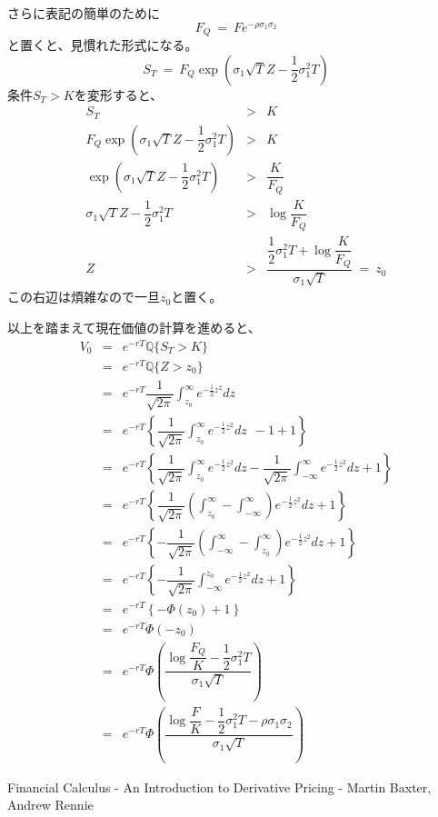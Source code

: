 \documentclass[uplatex,a4j,12pt,dvipdfmx]{jsarticle}
\begin{document}
さらに表記の簡単のために
$$
	F_{Q} \ = \ F e^{- \rho \sigma_{1} \sigma_{2} }
$$
と置くと、見慣れた形式になる。
$$
	S_{T}
	\ = \
	F_{Q}
	\exp \left( \sigma_{1} \sqrt{T} Z -
	\dfrac{1}{2} \sigma_{1}^{2} T
	\right)
$$
条件$S_{T}>K$を変形すると、
%
%
\begin{eqnarray*}
	S_{T}
	&>&
	K
	\\
	F_{Q}
	\exp \left( \sigma_{1} \sqrt{T} Z -
	\dfrac{1}{2} \sigma_{1}^{2} T
	\right)
	&>&
	K
	\\
	\exp \left( \sigma_{1} \sqrt{T} Z -
	\dfrac{1}{2} \sigma_{1}^{2} T
	\right)
	&>&
	\dfrac{K}{F_{Q}}
	\\
	\sigma_{1} \sqrt{T} Z -
	\dfrac{1}{2} \sigma_{1}^{2} T
	&>&
	\log
	\dfrac{K}{F_{Q}}
	\\
	Z
	&>&
	\dfrac{
		\dfrac{1}{2} \sigma_{1}^{2} T +
		\log
		\dfrac{K}{F_{Q}}
	}{\sigma_{1} \sqrt{T}}
	\ = \
	z_{0}
\end{eqnarray*}
%
%
この右辺は煩雑なので一旦$z_{0}$と置く。

以上を踏まえて現在価値の計算を進めると、
%
%
\begin{eqnarray*}
	V_{0}
	&=&
	e^{-rT}
	\mathbb{Q}
	\{ S_{T} > K \}
	\\ &=&
	e^{-rT}
	\mathbb{Q}
	\{ Z > z_{0} \}
	\\ &=&
	e^{-rT}
	\dfrac{1}{ \sqrt{2 \pi} }
	\int^{\infty}_{z_{0}}
	e^{
			- \frac{1}{2} z^{2}
		} dz
	\\ &=&
	e^{-rT}
	\left\{
	\dfrac{1}{ \sqrt{2 \pi} }
	\int^{\infty}_{z_{0}}
	e^{
			- \frac{1}{2} z^{2}
		} dz \ \
	-1+1
	\right\}
	\\ &=&
	e^{-rT}
	\left\{
	\dfrac{1}{ \sqrt{2 \pi} }
	\int^{\infty}_{z_{0}}
	e^{
			- \frac{1}{2} z^{2}
		} dz
	-
	\dfrac{1}{ \sqrt{2 \pi} }
	\int^{\infty}_{-\infty}
	e^{
			- \frac{1}{2} z^{2}
		} dz
	+1
	\right\}
	\\ &=&
	e^{-rT}
	\left\{
	\dfrac{1}{ \sqrt{2 \pi} }
	\left(
	\int^{\infty}_{z_{0}}
	-
	\int^{\infty}_{-\infty}
	\right)
	e^{
			- \frac{1}{2} z^{2}
		} dz
	+1
	\right\}
	\\ &=&
	e^{-rT}
	\left\{
	-
	\dfrac{1}{ \sqrt{2 \pi} }
	\left(
	\int_{-\infty}^{\infty}
	-
	\int^{\infty}_{z_{0}}
	\right)
	e^{
			- \frac{1}{2} z^{2}
		} dz
	+1
	\right\}
	\\ &=&
	e^{-rT}
	\left\{
	-
	\dfrac{1}{ \sqrt{2 \pi} }
	\int_{-\infty}^{z_{0}}
	e^{
			- \frac{1}{2} z^{2}
		} dz
	+1
	\right\}
	\\ &=&
	e^{-rT}
	\left\{
	-
	\Phi(z_{0})
	+1
	\right\}
	\\ &=&
	e^{-rT}
	\Phi(-z_{0})
	\\ &=&
	e^{-rT}
	\Phi
	\left(
	\dfrac{
		\log
		\dfrac{F_{Q}}{K}
		-
		\dfrac{1}{2} \sigma_{1}^{2} T
	}{\sigma_{1} \sqrt{T}}
	\right)
	\\ &=&
	e^{-rT}
	\Phi
	\left(
	\dfrac{
		\log
		\dfrac{F}{K}
		-
		\dfrac{1}{2} \sigma_{1}^{2} T
		-
		\rho \sigma_{1} \sigma_{2}
	}{\sigma_{1} \sqrt{T}}
	\right)
\end{eqnarray*}
%
%


\begin{thebibliography}{9}
	Financial Calculus - An Introduction to Derivative Pricing - Martin Baxter, Andrew Rennie
\end{thebibliography}
\end{document}
